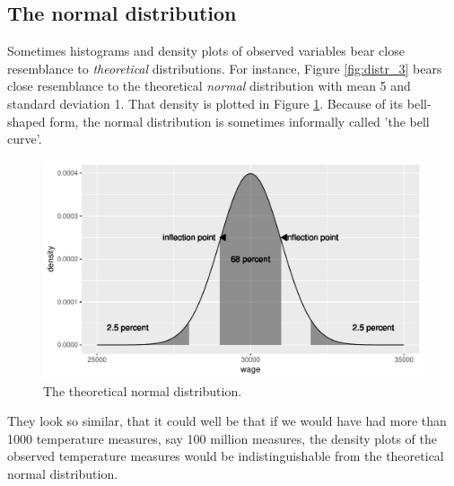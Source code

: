 \documentclass[]{report}\usepackage[]{graphicx}\usepackage[]{color}
\makeatletter
\def\maxwidth{ %
  \ifdim\Gin@nat@width>\linewidth
    \linewidth
  \else
    \Gin@nat@width
  \fi
}
\newenvironment{knitrout}{}{} %
\makeatother
\begin{document}
\subsection{The normal distribution}

Sometimes histograms and density plots of observed variables bear close resemblance to \textit{theoretical} distributions. For instance, Figure \ref{fig:distr_3} bears close resemblance to the theoretical \textit{normal} distribution with mean 5 and standard deviation 1. That density is plotted in Figure \ref{fig:distr_4}. Because of its bell-shaped form, the normal distribution is sometimes informally called 'the bell curve'.


\begin{knitrout}
\color{fgcolor}\begin{figure}

{\centering \includegraphics[width=\maxwidth]{figure/distr_4-1} 

}

\caption[The theoretical normal distribution]{The theoretical normal distribution.}\label{fig:distr_4}
\end{figure}


\end{knitrout}

They look so similar, that it could well be that if we would have had more than 1000 temperature measures, say 100 million measures, the density plots of the observed temperature measures would be indistinguishable from the theoretical normal distribution.
\end{document}
